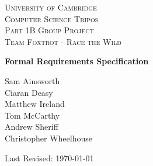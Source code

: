\begin{titlepage}
\begin{center}

\textsc{\LARGE University of Cambridge}\\[1.5cm]

\textsc{\Large Computer Science Tripos \\[2mm] Part 1B Group Project}\\[0.25cm]
\textsc{\Large Team Foxtrot - Race the Wild}\\[1.5cm]

\vspace{-8mm}

{ \huge \bfseries \vspace{3.5mm} Formal Requirements Specification }\\[0.4cm]


\begin{center}
\large
Sam Ainsworth\\
Ciaran Deasy\\
Matthew Ireland\\
Tom McCarthy\\
Andrew Sheriff\\
Christopher Wheelhouse\\
\end{center}

\vfill

{\large Last Revised: \today}
\end{center}
\end{titlepage}
